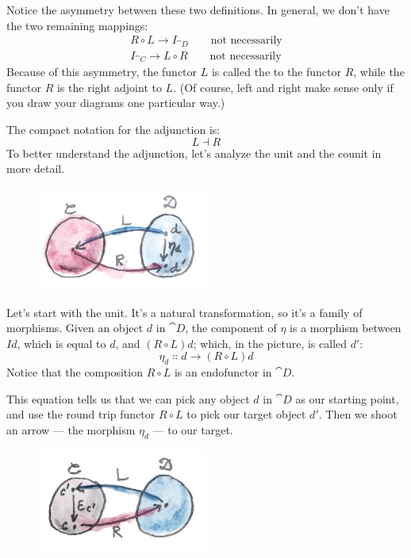Notice the asymmetry between these two definitions. In general, we don't
have the two remaining mappings:
\begin{gather*}
R \circ L \to I_{\cat{D}} \quad\quad\text{not necessarily} \\
I_{\cat{C}} \to L \circ R \quad\quad\text{not necessarily}
\end{gather*}
Because of this asymmetry, the functor $L$ is called the
 to the functor $R$, while the functor
$R$ is the right adjoint to $L$. (Of course, left and
right make sense only if you draw your diagrams one particular way.)

The compact notation for the adjunction is:
\[L \dashv R\]
To better understand the adjunction, let's analyze the unit and the
counit in more detail.

\begin{figure}[H]
\centering
\includegraphics[width=0.5\textwidth]{images/adj-unit.jpg}
\end{figure}

\noindent
Let's start with the unit. It's a natural transformation, so it's a
family of morphisms. Given an object $d$ in $\cat{D}$, the
component of $\eta$ is a morphism between $I d$, which is equal to
$d$, and $(R \circ L) d$; which, in the picture, is called
$d'$:
\[\eta_d \Colon d \to (R \circ L) d\]
Notice that the composition $R \circ L$ is an endofunctor in $\cat{D}$.

This equation tells us that we can pick any object $d$ in
$\cat{D}$ as our starting point, and use the round trip functor
$R \circ L$ to pick our target object $d'$. Then we
shoot an arrow --- the morphism $\eta_d$ --- to our target.

\begin{figure}[H]
\centering
\includegraphics[width=0.5\textwidth]{images/adj-counit.jpg}
\end{figure}

